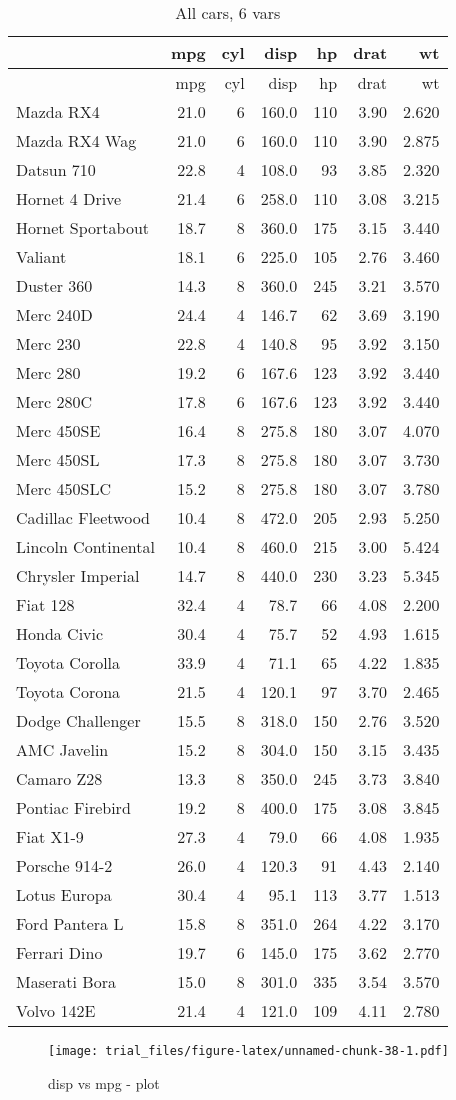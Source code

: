 \documentclass[]{article}
\begin{document}
\begin{longtable}[]{@{}lrrrrrr@{}}
\caption{All cars, 6 vars}\tabularnewline
\toprule
& mpg & cyl & disp & hp & drat & wt\tabularnewline
\midrule
\endfirsthead
\toprule
& mpg & cyl & disp & hp & drat & wt\tabularnewline
\midrule
\endhead
Mazda RX4 & 21.0 & 6 & 160.0 & 110 & 3.90 & 2.620\tabularnewline
Mazda RX4 Wag & 21.0 & 6 & 160.0 & 110 & 3.90 & 2.875\tabularnewline
Datsun 710 & 22.8 & 4 & 108.0 & 93 & 3.85 & 2.320\tabularnewline
Hornet 4 Drive & 21.4 & 6 & 258.0 & 110 & 3.08 & 3.215\tabularnewline
Hornet Sportabout & 18.7 & 8 & 360.0 & 175 & 3.15 & 3.440\tabularnewline
Valiant & 18.1 & 6 & 225.0 & 105 & 2.76 & 3.460\tabularnewline
Duster 360 & 14.3 & 8 & 360.0 & 245 & 3.21 & 3.570\tabularnewline
Merc 240D & 24.4 & 4 & 146.7 & 62 & 3.69 & 3.190\tabularnewline
Merc 230 & 22.8 & 4 & 140.8 & 95 & 3.92 & 3.150\tabularnewline
Merc 280 & 19.2 & 6 & 167.6 & 123 & 3.92 & 3.440\tabularnewline
Merc 280C & 17.8 & 6 & 167.6 & 123 & 3.92 & 3.440\tabularnewline
Merc 450SE & 16.4 & 8 & 275.8 & 180 & 3.07 & 4.070\tabularnewline
Merc 450SL & 17.3 & 8 & 275.8 & 180 & 3.07 & 3.730\tabularnewline
Merc 450SLC & 15.2 & 8 & 275.8 & 180 & 3.07 & 3.780\tabularnewline
Cadillac Fleetwood & 10.4 & 8 & 472.0 & 205 & 2.93 &
5.250\tabularnewline
Lincoln Continental & 10.4 & 8 & 460.0 & 215 & 3.00 &
5.424\tabularnewline
Chrysler Imperial & 14.7 & 8 & 440.0 & 230 & 3.23 & 5.345\tabularnewline
Fiat 128 & 32.4 & 4 & 78.7 & 66 & 4.08 & 2.200\tabularnewline
Honda Civic & 30.4 & 4 & 75.7 & 52 & 4.93 & 1.615\tabularnewline
Toyota Corolla & 33.9 & 4 & 71.1 & 65 & 4.22 & 1.835\tabularnewline
Toyota Corona & 21.5 & 4 & 120.1 & 97 & 3.70 & 2.465\tabularnewline
Dodge Challenger & 15.5 & 8 & 318.0 & 150 & 2.76 & 3.520\tabularnewline
AMC Javelin & 15.2 & 8 & 304.0 & 150 & 3.15 & 3.435\tabularnewline
Camaro Z28 & 13.3 & 8 & 350.0 & 245 & 3.73 & 3.840\tabularnewline
Pontiac Firebird & 19.2 & 8 & 400.0 & 175 & 3.08 & 3.845\tabularnewline
Fiat X1-9 & 27.3 & 4 & 79.0 & 66 & 4.08 & 1.935\tabularnewline
Porsche 914-2 & 26.0 & 4 & 120.3 & 91 & 4.43 & 2.140\tabularnewline
Lotus Europa & 30.4 & 4 & 95.1 & 113 & 3.77 & 1.513\tabularnewline
Ford Pantera L & 15.8 & 8 & 351.0 & 264 & 4.22 & 3.170\tabularnewline
Ferrari Dino & 19.7 & 6 & 145.0 & 175 & 3.62 & 2.770\tabularnewline
Maserati Bora & 15.0 & 8 & 301.0 & 335 & 3.54 & 3.570\tabularnewline
Volvo 142E & 21.4 & 4 & 121.0 & 109 & 4.11 & 2.780\tabularnewline
\bottomrule
\end{longtable}

\begin{figure}[htbp]
\centering
\texttt{[image: trial\_files/figure-latex/unnamed-chunk-38-1.pdf]}
\caption{disp vs mpg - plot}
\end{figure}
\end{document}
